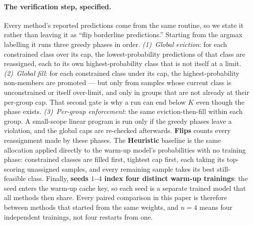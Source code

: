 \documentclass[10pt]{article}
\begin{document}
{\color{blue}
\paragraph{The verification step, specified.}
Every method's reported predictions come from the same routine, so we state it
rather than leaving it as ``flip borderline predictions.'' Starting from the
argmax labelling it runs three greedy phases in order. \emph{(1)~Global
eviction}: for each constrained class over its cap, the lowest-probability
predictions of that class are reassigned, each to its own highest-probability
class that is not itself at a limit. \emph{(2)~Global fill}: for each
constrained class under its cap, the highest-probability non-members are
promoted --- but only from samples whose current class is unconstrained or
itself over-limit, and only in groups that are not already at their per-group
cap. That second gate is why a run can end below $K$ even though the phase
exists. \emph{(3)~Per-group enforcement}: the same eviction-then-fill within
each group. A small-scope linear program is run only if the greedy phases leave
a violation, and the global caps are re-checked afterwards. \textbf{Flips} counts
every reassignment made by these phases. The \textbf{Heuristic} baseline is the
same allocation applied directly to the warm-up model's probabilities with no
training phase: constrained classes are filled first, tightest cap first, each
taking its top-scoring unassigned samples, and every remaining sample takes its
best still-feasible class. Finally, \textbf{seeds $1$--$4$ index four distinct
warm-up trainings}: the seed enters the warm-up cache key, so each seed is a
separate trained model that all methods then share. Every paired comparison in
this paper is therefore between methods that started from the same weights, and
$n{=}4$ means four independent trainings, not four restarts from one.
}
\end{document}
